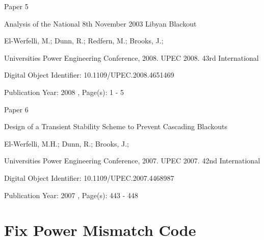 \documentclass[a4paper,oneside,12pt]{report}
\newcommand{\backmatter}{\cleardoublepage}
\begin{document}
\begin{center}\begin{large}
{\Huge Paper 5}
\vspace{40px}

Analysis of the National 8th November 2003 Libyan Blackout
\vspace{40px}

El-Werfelli, M.; Dunn, R.; Redfern, M.; Brooks, J.;
\vspace{40px}

Universities Power Engineering Conference, 2008. UPEC 2008. 43rd International
\vspace{40px}

Digital Object Identifier: 10.1109/UPEC.2008.4651469

Publication Year: 2008 , Page(s): 1 - 5
\end{large}\end{center}




\begin{center}\begin{large}
{\Huge Paper 6}
\vspace{40px}

Design of a Transient Stability Scheme to Prevent Cascading Blackouts
\vspace{40px}

El-Werfelli, M.H.; Dunn, R.; Brooks, J.;
\vspace{40px}

Universities Power Engineering Conference, 2007. UPEC 2007. 42nd International
\vspace{40px}

Digital Object Identifier: 10.1109/UPEC.2007.4468987

Publication Year: 2007 , Page(s): 443 - 448
\end{large}\end{center}




\chapter{Fix Power Mismatch Code}\label{lbl_sec_code}




\backmatter
{}


\end{document}
